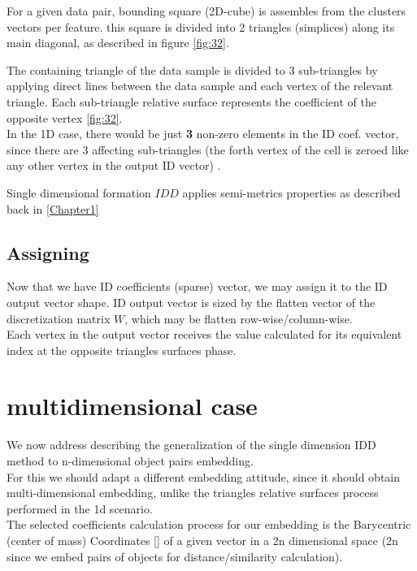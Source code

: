 		
		
		For a given data pair, bounding square (2D-cube) is assembles from the clusters vectors per feature.
		this square is divided into 2 triangles (simplices) along its main diagonal, as described in figure \ref{fig:32}.
		
		The containing triangle of the data sample is divided to 3 sub-triangles by applying direct lines between the data sample and each vertex of the relevant triangle. Each sub-triangle relative surface represents the coefficient of the opposite vertex \ref{fig:32}. \\ 
		In the 1D case, there would be just \textbf{3} non-zero elements in the ID coef. vector, since there are 3 affecting sub-triangles (the forth vertex of the cell is zeroed like any other vertex in the output ID vector) .
				
		Single dimensional formation $IDD$ applies semi-metrics properties as described back in \ref{Chapter1}
		
			
	\subsection{Assigning}
	Now that we have ID coefficients (sparse) vector, we may assign it to the ID output vector shape.
	ID output vector is sized by the flatten vector of the discretization matrix $W$, which may be flatten row-wise/column-wise.\\
	Each vertex in the output vector receives the value calculated for its equivalent index at the opposite triangles surfaces phase.
	


\section{multidimensional case}

We now address describing the generalization of the single dimension IDD method to n-dimensional object pairs embedding. \\
For this we should adapt a different embedding attitude, since it should obtain multi-dimensional embedding, unlike the triangles relative surfaces process performed in the 1d scenario.  \\
The selected coefficients calculation process for our embedding is the Barycentric (center of mass) Coordinates [] of a given vector in a 2n dimensional space (2n since we embed pairs of objects for distance/similarity calculation).

